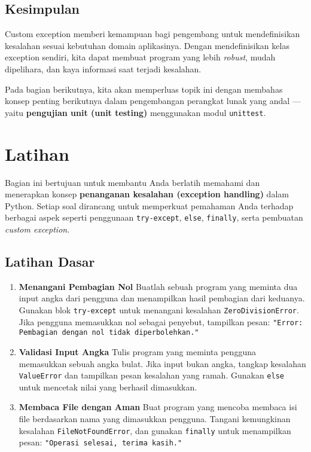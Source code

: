 \subsection*{Kesimpulan}

Custom exception memberi kemampuan bagi pengembang untuk mendefinisikan kesalahan sesuai kebutuhan domain aplikasinya.  
Dengan mendefinisikan kelas exception sendiri, kita dapat membuat program yang lebih \textit{robust}, mudah dipelihara, dan kaya informasi saat terjadi kesalahan.

Pada bagian berikutnya, kita akan memperluas topik ini dengan membahas konsep penting berikutnya dalam pengembangan perangkat lunak yang andal — yaitu \textbf{pengujian unit (unit testing)} menggunakan modul \texttt{unittest}.



\section{Latihan}

Bagian ini bertujuan untuk membantu Anda berlatih memahami dan menerapkan konsep \textbf{penanganan kesalahan (exception handling)} dalam Python.  
Setiap soal dirancang untuk memperkuat pemahaman Anda terhadap berbagai aspek seperti penggunaan \texttt{try-except}, \texttt{else}, \texttt{finally}, serta pembuatan \textit{custom exception}.

\subsection*{Latihan Dasar}

\begin{enumerate}
    \item \textbf{Menangani Pembagian Nol}  
    Buatlah sebuah program yang meminta dua input angka dari pengguna dan menampilkan hasil pembagian dari keduanya.  
    Gunakan blok \texttt{try-except} untuk menangani kesalahan \texttt{ZeroDivisionError}.  
    Jika pengguna memasukkan nol sebagai penyebut, tampilkan pesan:  
    \texttt{"Error: Pembagian dengan nol tidak diperbolehkan."}

    \item \textbf{Validasi Input Angka}  
    Tulis program yang meminta pengguna memasukkan sebuah angka bulat.  
    Jika input bukan angka, tangkap kesalahan \texttt{ValueError} dan tampilkan pesan kesalahan yang ramah.  
    Gunakan \texttt{else} untuk mencetak nilai yang berhasil dimasukkan.

    \item \textbf{Membaca File dengan Aman}  
    Buat program yang mencoba membaca isi file berdasarkan nama yang dimasukkan pengguna.  
    Tangani kemungkinan kesalahan \texttt{FileNotFoundError}, dan gunakan \texttt{finally} untuk menampilkan pesan:  
    \texttt{"Operasi selesai, terima kasih."}
\end{enumerate}

